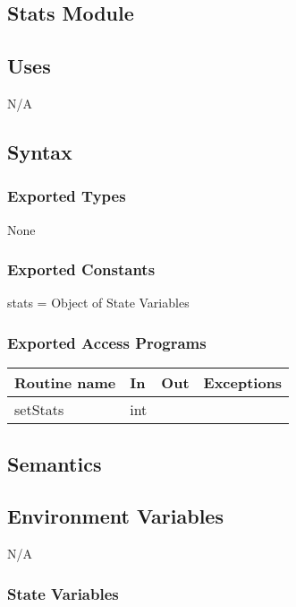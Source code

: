\documentclass[12pt]{article}
\begin{document}
\subsection* {Stats Module}

\subsection* {Uses}

N/A

\subsection* {Syntax}

\subsubsection* {Exported Types}

None

\subsubsection* {Exported Constants}

stats = Object of State Variables

\subsubsection* {Exported Access Programs}

\begin{tabular}{| l | l | l | p{6cm} |}
\hline
\textbf{Routine name} & \textbf{In} & \textbf{Out} & \textbf{Exceptions}\\
\hline
setStats & int & ~ &  \\
\hline
\end{tabular}

\subsection* {Semantics}

\subsection*{Environment Variables}

N/A

\subsubsection* {State Variables}
\end{document}
